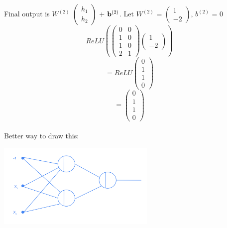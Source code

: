 \begin{example}
Final output is
        $W^{(2)}$ $\begin{pmatrix}
        h_1\\
        h_2
        \end{pmatrix}$
        + $\vb^{(2)}$.
    Let $W^{(2)}$ = $\begin{pmatrix}
        1\\
        -2
        \end{pmatrix}$,
        $b^{(2)}$ = 0\\
        \begin{equation*}
            ReLU\left(
            \begin{pmatrix}
                0 & 0\\
                1 & 0\\
                1 & 0\\
                2 & 1
            \end{pmatrix}
            \begin{pmatrix}
                1\\
                -2
            \end{pmatrix}\right)
        \end{equation*}
        \begin{equation*}
            =ReLU
            \begin{pmatrix}
                0 \\
                1 \\
                1 \\
                0
            \end{pmatrix}
        \end{equation*}
        \begin{equation*}
            =\begin{pmatrix}
                0 \\
                1 \\
                1 \\
                0
            \end{pmatrix}
        \end{equation*}\\
        Better way to draw this:
    \begin{center}
        \includegraphics[width=3in]{images/Chapter 10/better.png}
    \end{center}
 \end{example}
 
